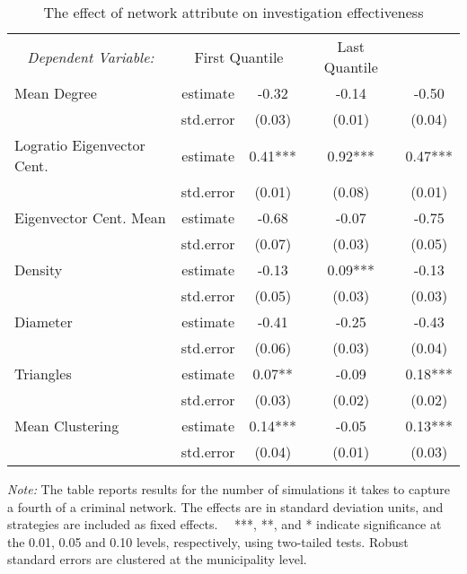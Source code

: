 \begin{table}[H]

\caption{\label{tab:table1}The effect of network attribute on investigation effectiveness}
\centering
\begin{threeparttable}
\begin{tabular}[t]{lcccc}
\toprule
\multicolumn{1}{c}{\textit{Dependent Variable:}} & \multicolumn{2}{c}{First Quantile} & \multicolumn{1}{c}{Last Quantile} \\
\cmidrule(l{3pt}r{3pt}){1-1} \cmidrule(l{3pt}r{3pt}){2-3} \cmidrule(l{3pt}r{3pt}){4-4}
Mean Degree & estimate & -0.32 & -0.14 & -0.50\\
 & std.error & (0.03) & (0.01) & (0.04)\\
Logratio Eigenvector Cent. & estimate & 0.41*** & 0.92*** & 0.47***\\
\addlinespace
 & std.error & (0.01) & (0.08) & (0.01)\\
Eigenvector Cent. Mean & estimate & -0.68 & -0.07 & -0.75\\
 & std.error & (0.07) & (0.03) & (0.05)\\
\addlinespace
Density & estimate & -0.13 & 0.09*** & -0.13\\
 & std.error & (0.05) & (0.03) & (0.03)\\
Diameter & estimate & -0.41 & -0.25 & -0.43\\
\addlinespace
 & std.error & (0.06) & (0.03) & (0.04)\\
Triangles & estimate & 0.07** & -0.09 & 0.18***\\
 & std.error & (0.03) & (0.02) & (0.02)\\
\addlinespace
Mean Clustering & estimate & 0.14*** & -0.05 & 0.13***\\
 & std.error & (0.04) & (0.01) & (0.03)\\
\bottomrule
\end{tabular}
\begin{tablenotes}[para]
\item \footnotesize \textit{Note:} The table reports results for the number of simulations it 
      takes to capture a fourth of a criminal network. The effects are in standard deviation units, 
      and strategies are included as fixed effects. \ \
      ***, **, and *
      indicate significance at the 0.01, 0.05 and 0.10 levels, respectively, using two-tailed tests. Robust standard errors are clustered
      at the municipality level.
\end{tablenotes}
\end{threeparttable}
\end{table}
